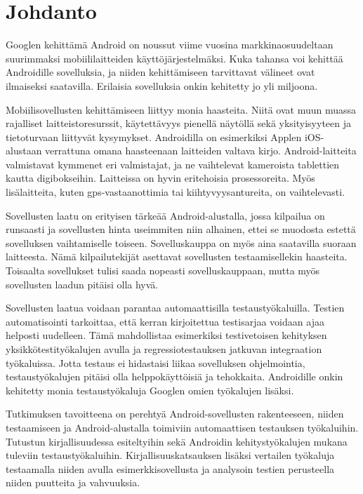 \section{Johdanto}

Googlen kehittämä Android on noussut viime vuosina markkinaosuudeltaan suurimmaksi mobiililaitteiden käyttöjärjestelmäksi. Kuka tahansa voi kehittää Androidille sovelluksia, ja niiden kehittämiseen tarvittavat välineet ovat ilmaiseksi saatavilla. Erilaisia sovelluksia onkin kehitetty jo yli miljoona.

Mobiilisovellusten kehittämiseen liittyy monia haasteita. Niitä ovat muun muassa rajalliset laitteistoresurssit, käytettävyys pienellä näytöllä sekä yksityisyyteen ja tietoturvaan liittyvät kysymykset. Androidilla on esimerkiksi Applen iOS-alustaan verrattuna omana haasteenaan laitteiden valtava kirjo. Android-laitteita valmistavat kymmenet eri valmistajat, ja ne vaihtelevat kameroista tablettien kautta digibokseihin. Laitteissa on hyvin eritehoisia prosessoreita. Myös lisälaitteita, kuten gps-vastaanottimia tai kiihtyvyysantureita, on vaihtelevasti.

Sovellusten laatu on erityisen tärkeää Android-alustalla, jossa kilpailua on runsaasti ja sovellusten hinta useimmiten niin alhainen, ettei se muodosta estettä sovelluksen vaihtamiselle toiseen. Sovelluskauppa on myös aina saatavilla suoraan laitteesta. Nämä kilpailutekijät asettavat sovellusten testaamisellekin haasteita. Toisaalta sovellukset tulisi saada nopeasti sovelluskauppaan, mutta myös sovellusten laadun pitäisi olla hyvä. 

Sovellusten laatua voidaan parantaa automaattisilla testaustyökaluilla. Testien automatisointi tarkoittaa, että kerran kirjoitettua testisarjaa voidaan ajaa helposti uudelleen. Tämä mahdollistaa esimerkiksi testivetoisen kehityksen yksikkötestityökalujen avulla ja regressiotestauksen jatkuvan integraation työkaluissa. Jotta testaus ei hidastaisi liikaa sovelluksen ohjelmointia, testaustyökalujen pitäisi olla helppokäyttöisiä ja tehokkaita. Androidille onkin kehitetty monia testaustyökaluja Googlen omien työkalujen lisäksi.

Tutkimuksen tavoitteena on perehtyä Android-sovellusten rakenteeseen, niiden testaamiseen ja Android-alustalla toimiviin automaattisen testauksen työkaluihin. Tutustun kirjallisuudessa esiteltyihin sekä Androidin kehitystyökalujen mukana tuleviin testaustyökaluihin. Kirjallisuuskatsauksen lisäksi vertailen työkaluja testaamalla niiden avulla esimerkkisovellusta ja analysoin testien perusteella niiden puutteita ja vahvuuksia.

